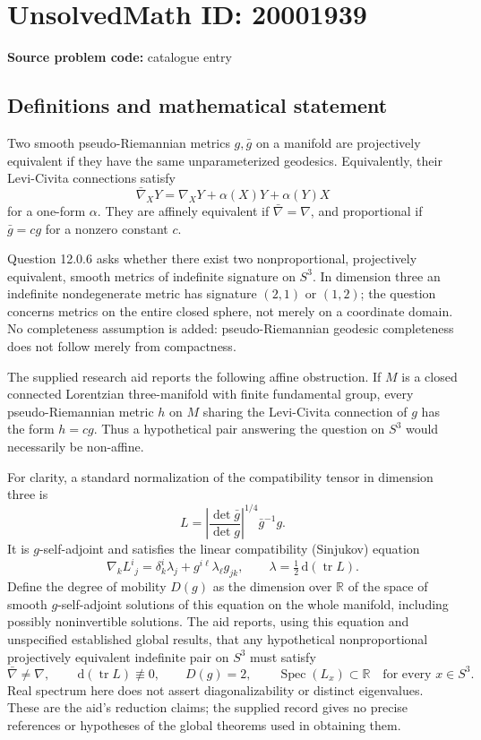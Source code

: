 \documentclass[11pt]{article}
\newcommand{\R}{\mathbb{R}}
\newcommand{\dd}{\,\mathrm{d}}
\begin{document}
\section*{UnsolvedMath ID: 20001939}
\textbf{Source problem code:} catalogue entry
\subsection{Definitions and mathematical statement}
Two smooth pseudo-Riemannian metrics \(g,\bar g\) on a manifold are projectively equivalent if they have the same unparameterized geodesics. Equivalently, their Levi-Civita connections satisfy
\[
 \bar\nabla_XY=\nabla_XY+\alpha(X)Y+\alpha(Y)X
\]
for a one-form \(\alpha\). They are affinely equivalent if \(\bar\nabla=\nabla\), and proportional if \(\bar g=cg\) for a nonzero constant \(c\).

Question 12.0.6 asks whether there exist two nonproportional, projectively equivalent, smooth metrics of indefinite signature on \(S^3\). In dimension three an indefinite nondegenerate metric has signature \((2,1)\) or \((1,2)\); the question concerns metrics on the entire closed sphere, not merely on a coordinate domain. No completeness assumption is added: pseudo-Riemannian geodesic completeness does not follow merely from compactness.

The supplied research aid reports the following affine obstruction. If \(M\) is a closed connected Lorentzian three-manifold with finite fundamental group, every pseudo-Riemannian metric \(h\) on \(M\) sharing the Levi-Civita connection of \(g\) has the form \(h=cg\). Thus a hypothetical pair answering the question on \(S^3\) would necessarily be non-affine.

For clarity, a standard normalization of the compatibility tensor in dimension three is
\[
 L=\left|\frac{\det\bar g}{\det g}\right|^{1/4}\bar g^{-1}g.
\]
It is \(g\)-self-adjoint and satisfies the linear compatibility (Sinjukov) equation
\[
 \nabla_kL^i{}_j=\delta^i_k\lambda_j+g^{i\ell}\lambda_\ell g_{jk},
 \qquad \lambda=\tfrac12\dd(\operatorname{tr}L).
\]
Define the degree of mobility \(D(g)\) as the dimension over \(\R\) of the space of smooth \(g\)-self-adjoint solutions of this equation on the whole manifold, including possibly noninvertible solutions. The aid reports, using this equation and unspecified established global results, that any hypothetical nonproportional projectively equivalent indefinite pair on \(S^3\) must satisfy
\[
 \bar\nabla\ne\nabla,\qquad
 \dd(\operatorname{tr}L)\not\equiv0,\qquad
 D(g)=2,\qquad
 \operatorname{Spec}(L_x)\subset\R\quad\text{for every }x\in S^3.
\]
Real spectrum here does not assert diagonalizability or distinct eigenvalues. These are the aid's reduction claims; the supplied record gives no precise references or hypotheses of the global theorems used in obtaining them.
\end{document}
